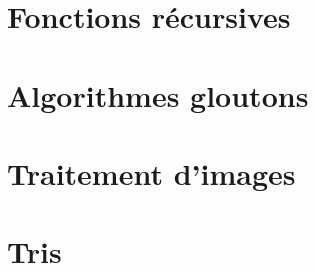 \renewcommand{\td}{02_ExponentiationRapide}
\graphicspath{{\repStyle/png/}{\repExo/\td/images/}}


\section*{Fonctions récursives}
\renewcommand{\repExo}{../../Informatique/S1_Themes/05_FonctionsRecursives}

\renewcommand{\td}{01_AlgorithmesDichotomiques}
\graphicspath{{\repStyle/png/}{\repExo/\td/images/}}


\renewcommand{\td}{02_FiguresAlphaNumeriques}
\graphicspath{{\repStyle/png/}{\repExo/\td/images/}}


\renewcommand{\td}{03_Fractales}
\graphicspath{{\repStyle/png/}{\repExo/\td/images/}}


\renewcommand{\td}{04_EnumerationListes}
\graphicspath{{\repStyle/png/}{\repExo/\td/images/}}


\section*{Algorithmes gloutons}
\renewcommand{\repExo}{../../Informatique/S1_Themes/06_Gloutons}

\renewcommand{\td}{01_RenduMonnaie}
\graphicspath{{\repStyle/png/}{\repExo/\td/images/}}


\renewcommand{\td}{02_AllocationSalles}
\graphicspath{{\repStyle/png/}{\repExo/\td/images/}}



\renewcommand{\td}{03_SelectionActivites}
\graphicspath{{\repStyle/png/}{\repExo/\td/images/}}



\section*{Traitement d'images}
\renewcommand{\repExo}{../../Informatique/S1_Themes/07_Images}

\renewcommand{\td}{01_TraitementImages}
\graphicspath{{\repStyle/png/}{\repExo/\td/images/}}


\renewcommand{\td}{02_Convolution}
\graphicspath{{\repStyle/png/}{\repExo/\td/images/}}


\section*{Tris}
\renewcommand{\repExo}{../../Informatique/S1_Themes/08_Tris}

